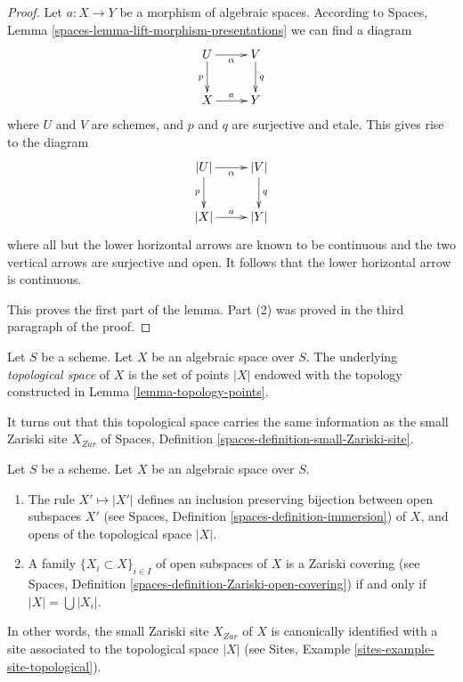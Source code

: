 \begin{proof}
\medskip\noindent
Let $a : X \to Y$ be a morphism of algebraic spaces. According to
Spaces, Lemma \ref{spaces-lemma-lift-morphism-presentations}
we can find a diagram
$$
\xymatrix{
U \ar[d]_p \ar[r]_\alpha & V \ar[d]^q \\
X \ar[r]^a & Y
}
$$
where $U$ and $V$ are schemes, and $p$ and $q$ are surjective and etale.
This gives rise to the diagram
$$
\xymatrix{
|U| \ar[d]_p \ar[r]_\alpha & |V| \ar[d]^q \\
|X| \ar[r]^a & |Y|
}
$$
where all but the lower horizontal arrows are known to be continuous and
the two vertical arrows are surjective and open. It follows that the
lower horizontal arrow is continuous.

\medskip\noindent
This proves the first part of the lemma. Part (2) was proved in the
third paragraph of the proof.
\end{proof}

\begin{definition}
\label{definition-topological-space}
Let $S$ be a scheme. Let $X$ be an algebraic space over $S$.
The underlying {\it topological space} of $X$ is the set of points
$|X|$ endowed with the topology constructed in
Lemma \ref{lemma-topology-points}.
\end{definition}

\noindent
It turns out that this topological space carries the same information
as the small Zariski site $X_{Zar}$ of
Spaces, Definition \ref{spaces-definition-small-Zariski-site}.

\begin{lemma}
\label{lemma-open-subspaces}
Let $S$ be a scheme.
Let $X$ be an algebraic space over $S$.
\begin{enumerate}
\item The rule $X' \mapsto |X'|$ defines an inclusion preserving
bijection between open subspaces $X'$ (see
Spaces, Definition \ref{spaces-definition-immersion})
of $X$, and opens of the topological space $|X|$.
\item A family $\{X_i \subset X\}_{i \in I}$ of open subspaces of $X$
is a Zariski covering (see
Spaces, Definition \ref{spaces-definition-Zariski-open-covering})
if and only if $|X| = \bigcup |X_i|$.
\end{enumerate}
In other words, the small Zariski site $X_{Zar}$ of $X$ is canonically
identified with a site associated to the topological space $|X|$ (see
Sites, Example \ref{sites-example-site-topological}).
\end{lemma}

